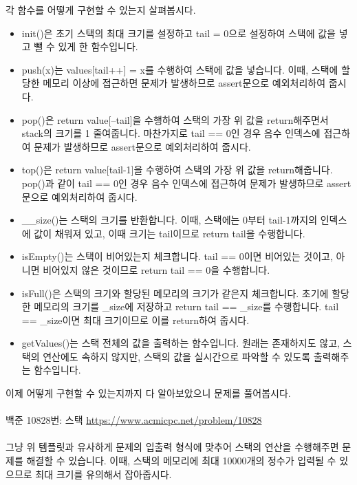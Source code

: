 \documentclass{article}
\begin{document}
각 함수를 어떻게 구현할 수 있는지 살펴봅시다.
\begin{itemize}
    \item init()은 초기 스택의 최대 크기를 설정하고 tail = 0으로 설정하여 스택에 값을 넣고 뺄 수 있게 한 함수입니다.
    \item push(x)는 values[tail++] = x를 수행하여 스택에 값을 넣습니다. 이때, 스택에 할당한 메모리 이상에 접근하면 문제가 발생하므로 assert문으로 예외처리하여 줍시다.
    \item pop()은 return value[--tail]을 수행하여 스택의 가장 위 값을 return해주면서 stack의 크기를 1 줄여줍니다. 마찬가지로 tail == 0인 경우 음수 인덱스에 접근하여 문제가 발생하므로 assert문으로 예외처리하여 줍시다.
    \item top()은 return value[tail-1]을 수행하여 스택의 가장 위 값을 return해줍니다. pop()과 같이 tail == 0인 경우 음수 인덱스에 접근하여 문제가 발생하므로 assert문으로 예외처리하여 줍시다.
    \item \_\_size()는 스택의 크기를 반환합니다. 이때, 스택에는 0부터 tail-1까지의 인덱스에 값이 채워져 있고, 이때 크기는 tail이므로 return tail을 수행합니다.
    \item isEmpty()는 스택이 비어있는지 체크합니다. tail == 0이면 비어있는 것이고, 아니면 비어있지 않은 것이므로 return tail == 0을 수행합니다.
    \item isFull()은 스택의 크기와 할당된 메모리의 크기가 같은지 체크합니다. 초기에 할당한 메모리의 크기를 \_size에 저장하고 return tail == \_size를 수행합니다. tail == \_size이면 최대 크기이므로 이를 return하여 줍시다.
    \item getValues()는 스택 전체의 값을 출력하는 함수입니다. 원래는 존재하지도 않고, 스택의 연산에도 속하지 않지만, 스택의 값을 실시간으로 파악할 수 있도록 출력해주는 함수입니다.
\end{itemize}

\noindent 이제 어떻게 구현할 수 있는지까지 다 알아보았으니 문제를 풀어봅시다.\\\\
백준 10828번: 스택 \href{https://www.acmicpc.net/problem/10828}{https://www.acmicpc.net/problem/10828}\\\\

\noindent 그냥 위 템플릿과 유사하게 문제의 입출력 형식에 맞추어 스택의 연산을 수행해주면 문제를 해결할 수 있습니다. 이때, 스택의 메모리에 최대 10000개의 정수가 입력될 수 있으므로 최대 크기를 유의해서 잡아줍시다.\\\\
\end{document}
